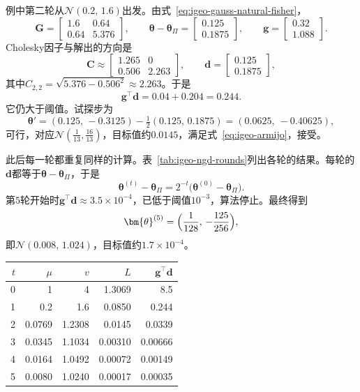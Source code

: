 例中第二轮从$\mathcal{N}(0.2,\,1.6)$出发。由式~\eqref{eq:igeo-gauss-natural-fisher}，
\[
  \bm{G}=\begin{bmatrix}1.6&0.64\\0.64&5.376\end{bmatrix},\qquad\bm{\theta}-\bm{\theta}_{\Pi}=\begin{bmatrix}0.125\\0.1875\end{bmatrix},\qquad\bm{g}=\begin{bmatrix}0.32\\1.088\end{bmatrix}.
\]
Cholesky因子与解出的方向是
\[
  \bm{C}\approx\begin{bmatrix}1.265&0\\0.506&2.263\end{bmatrix},\qquad\bm{d}=\begin{bmatrix}0.125\\0.1875\end{bmatrix},
\]
其中$C_{2,2}=\sqrt{5.376-0.506^{2}}\approx2.263$。于是
\[
  \bm{g}^{\top}\bm{d}=0.04+0.204=0.244 .
\]
它仍大于阈值。试探步为
\[
  \bm{\theta}'=(0.125,\,-0.3125)-\tfrac12(0.125,\,0.1875)=(0.0625,\ -0.40625),
\]
可行，对应$\mathcal{N}(\frac1{13},\frac{16}{13})$，目标值约$0.0145$，满足式~\eqref{eq:igeo-armijo}，接受。

此后每一轮都重复同样的计算。表~\ref{tab:igeo-ngd-rounds}列出各轮的结果。每轮的$\bm{d}$都等于$\bm{\theta}-\bm{\theta}_{\Pi}$，于是
\[
  \bm{\theta}^{(t)}-\bm{\theta}_{\Pi}=2^{-t}\bigl(\bm{\theta}^{(0)}-\bm{\theta}_{\Pi}\bigr).
\]
第$5$轮开始时$\bm{g}^{\top}\bm{d}\approx3.5\times10^{-4}$，已低于阈值$10^{-3}$，算法停止。最终得到
\[
  \bm{\theta}^{(5)}=\Bigl(\frac1{128},\,-\frac{125}{256}\Bigr),
\]
即$\mathcal{N}(0.008,\,1.024)$，目标值约$1.7\times10^{-4}$。

\begin{BookInlineTable}
  \centering
  \caption{自然梯度迭代的各轮结果，$\alpha=\frac12$，起点$\mathcal{N}(1,4)$，目标$\mathcal{N}(0,1)$。$\bm{g}^{\top}\bm{d}$是本轮开始时自然梯度长度的平方，用于停止判据。}
  \label{tab:igeo-ngd-rounds}
  \begin{tabular}{rrrrr}
    \toprule
    $t$ & $\mu$ & $v$ & $L$ & $\bm{g}^{\top}\bm{d}$ \\
    \midrule
    0 & 1 & 4 & 1.3069 & 8.5 \\
    1 & 0.2 & 1.6 & 0.0850 & 0.244 \\
    2 & 0.0769 & 1.2308 & 0.0145 & 0.0339 \\
    3 & 0.0345 & 1.1034 & 0.00310 & 0.00666 \\
    4 & 0.0164 & 1.0492 & 0.00072 & 0.00149 \\
    5 & 0.0080 & 1.0240 & 0.00017 & 0.00035 \\
    \bottomrule
  \end{tabular}
\end{BookInlineTable}

